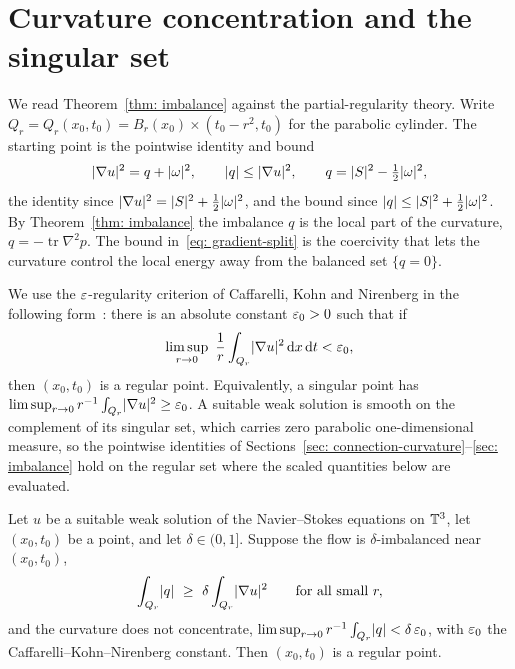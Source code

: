 \section{Curvature concentration and the singular set}
\label{sec: dichotomy}

We read Theorem~\ref{thm: imbalance} against the partial-regularity theory. Write
$Q_r = Q_r(x_0,t_0) = B_r(x_0)\times(t_0-r^2,t_0)$ for the parabolic cylinder.
The starting point is the pointwise identity and bound
\begin{equation}\label{eq: gradient-split}
  \lvert \nabla u \rvert^2 = q + \lvert \omega \rvert^2,
  \qquad \lvert q \rvert \le \lvert \nabla u \rvert^2,
  \qquad q = \lvert S \rvert^2 - \tfrac12\lvert \omega \rvert^2,
\end{equation}
the identity since $\lvert \nabla u \rvert^2 = \lvert S \rvert^2 + \tfrac12\lvert \omega \rvert^2$, and the
bound since $\lvert q \rvert \le \lvert S \rvert^2 + \tfrac12\lvert \omega \rvert^2$. By
Theorem~\ref{thm: imbalance} the imbalance $q$ is the local part of the curvature,
$q = -\operatorname{tr}\nabla^2 p$. The bound in~\eqref{eq: gradient-split} is the
coercivity that lets the curvature control the local energy away from the balanced
set $\{q = 0\}$.

We use the $\varepsilon$-regularity criterion of Caffarelli, Kohn and Nirenberg in the
following form~\cite{caffarelli-1982-par-reg-sui}: there is an absolute constant
$\varepsilon_0 > 0$ such that if
\begin{equation}\label{eq: ckn}
  \limsup_{r\to0}\ \frac{1}{r}\int_{Q_r}\lvert \nabla u \rvert^2\,\mathrm{d} x\,\mathrm{d} t < \varepsilon_0,
\end{equation}
then $(x_0,t_0)$ is a regular point. Equivalently, a singular point has
$\limsup_{r\to0} r^{-1}\int_{Q_r}\lvert \nabla u \rvert^2 \ge \varepsilon_0$. A suitable weak
solution is smooth on the complement of its singular set, which carries zero
parabolic one-dimensional measure, so the pointwise identities of
Sections~\ref{sec: connection-curvature}--\ref{sec: imbalance} hold on the regular
set where the scaled quantities below are evaluated.

\begin{proposition}\label{prop: coercive}
Let $u$ be a suitable weak solution of
the Navier--Stokes equations on $\mathbb{T}^3$, let $(x_0,t_0)$ be a point, and let
$\delta \in (0,1]$. Suppose the flow is $\delta$-imbalanced near $(x_0,t_0)$,
\begin{equation}\label{eq: delta-imbalance}
  \int_{Q_r}\lvert q \rvert \ \ge\ \delta\int_{Q_r}\lvert \nabla u \rvert^2
  \qquad\text{for all small } r,
\end{equation}
and the curvature does not concentrate,
$\limsup_{r\to0} r^{-1}\int_{Q_r}\lvert q \rvert < \delta\,\varepsilon_0$, with $\varepsilon_0$ the
Caffarelli--Kohn--Nirenberg constant. Then $(x_0,t_0)$ is a regular
point.
\end{proposition}

